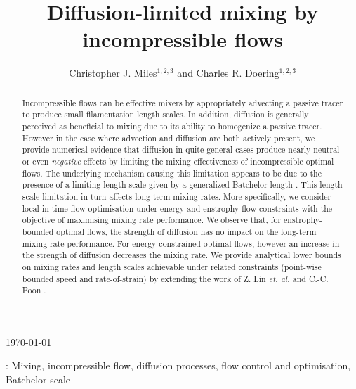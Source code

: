 \documentclass[12pt]{iopart}
\begin{document}
\title[Diffusion-limited mixing by incompressible flows]{Diffusion-limited mixing by incompressible flows}

\author{Christopher J. Miles$^{1,2,3}$ and Charles R. Doering$^{1,2,3}$ }

\address{$^1$ Department of Physics, University of Michigan,
Ann Arbor, MI 48104-1040, USA}
\address{$^2$ Department of Mathematics, University of Michigan,
Ann Arbor, MI 48104-1043, USA}
\address{$^3$ Center for the Study of Complex Systems, University of Michigan,
Ann Arbor, MI 48104-1107, USA}
\vspace{10pt}
\begin{indented}
\item[]\today
\end{indented}

\begin{abstract}
Incompressible flows can be effective mixers by appropriately advecting a passive tracer to produce small filamentation length scales. In addition, diffusion is generally perceived as beneficial to mixing due to its ability to homogenize a passive tracer. However in the case where advection and diffusion are both actively present, we provide numerical evidence that diffusion in quite general cases produce nearly neutral or even {\it negative} effects by limiting the mixing effectiveness of incompressible optimal flows. The underlying mechanism causing this limitation appears to be due to the presence of a limiting length scale given by a generalized Batchelor length \cite{Batchelor1959a}. This length scale limitation in turn affects long-term mixing rates. More specifically, we consider local-in-time flow optimisation under energy and enstrophy flow constraints with the objective of maximising mixing rate performance. We observe that, for enstrophy-bounded optimal flows, the strength of diffusion has no impact on the long-term mixing rate performance. For energy-constrained optimal flows, however an increase in the strength of diffusion decreases the mixing rate. We provide analytical lower bounds on mixing rates and length scales achievable under related constraints (point-wise bounded speed and rate-of-strain) by extending the work of Z. Lin {\it et. al.} \cite{JFM2011} and C.-C. Poon \cite{Chi-Cheu1996}. 

\end{abstract}
%
%
\vspace{2pc}
: Mixing, incompressible flow, diffusion processes, flow control and optimisation, Batchelor scale
\end{document}

